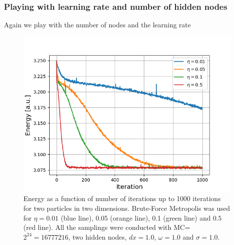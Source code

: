 \documentclass[norsk,a4paper,12pt]{article}
\begin{document}
\subsubsection{Playing with learning rate and number of hidden nodes}
Again we play with the number of nodes and the learning rate

 \begin{figure} [H]
 	\centering
 	\includegraphics[scale=0.8]{plots/energy_compare_eta_2P.png}
 	\caption{Energy as a function of number of iterations up to 1000 iterations for two particles in two dimensions. Brute-Force Metropolis was used for $\eta=0.01$ (blue line), 0.05 (orange line), 0.1 (green line) and $0.5$ (red line). All the samplings were conducted with MC=$2^{24}=16777216$, two hidden nodes, $dx=1.0$, $\omega=1.0$ and $\sigma=1.0$.}
 	\label{fig:energy2P2D}
 \end{figure}
\end{document}
